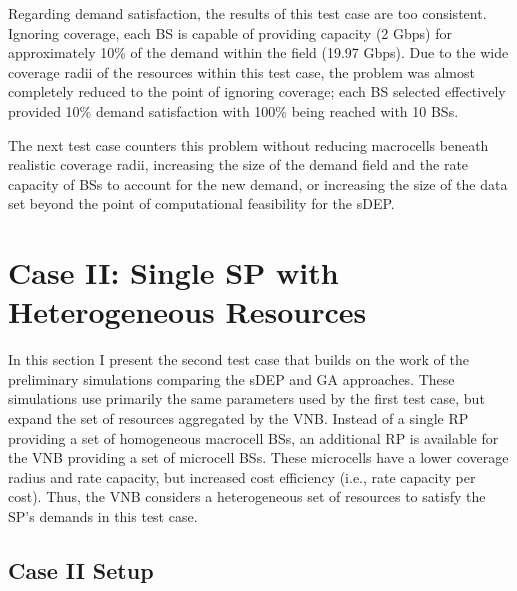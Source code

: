 \documentclass[12pt,dvipsnames]{report}
\begin{document}
Regarding demand satisfaction, the results of this test case are too consistent.  Ignoring coverage, each BS is capable of providing capacity (2 Gbps) for approximately 10\% of the demand within the field (19.97 Gbps).  Due to the wide coverage radii of the resources within this test case, the problem was almost completely reduced to the point of ignoring coverage; each BS selected effectively provided 10\% demand satisfaction with 100\% being reached with 10 BSs.

The next test case counters this problem without reducing macrocells beneath realistic coverage radii, increasing the size of the demand field and the rate capacity of BSs to account for the new demand, or increasing the size of the data set beyond the point of computational feasibility for the sDEP.

\section{Case II: Single SP with Heterogeneous Resources} \label{sec:caseII}

In this section I present the second test case that builds on the work of the preliminary simulations comparing the sDEP and GA approaches.  These simulations use primarily the same parameters used by the first test case, but expand the set of resources aggregated by the VNB.  Instead of a single RP providing a set of homogeneous macrocell BSs, an additional RP is available for the VNB providing a set of microcell BSs.  These microcells have a lower coverage radius and rate capacity, but increased cost efficiency (i.e., rate capacity per cost).  Thus, the VNB considers a heterogeneous set of resources to satisfy the SP's demands in this test case.

\subsection{Case II Setup} \label{subsec:caseII_setup}
\end{document}
